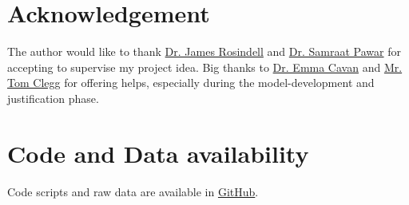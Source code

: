 \documentclass[../thesis.tex]{subfiles} %
\begin{document}
\section{Acknowledgement}
The author would like to thank \href{mailto:j.rosindell@imperial.ac.uk}{Dr. James Rosindell} and \href{mailto:s.pawar@imperial.ac.uk}{Dr. Samraat Pawar} for accepting to supervise my project idea.  
Big thanks to \href{mailto:e.cavan@imperial.ac.uk}{Dr. Emma Cavan} and \href{mailto:t.clegg17@imperial.ac.uk}{Mr. Tom Clegg} for offering helps, especially during the model-development and justification phase.


\section{Code and Data availability}
Code scripts and raw data are available in \href{https://github.com/ph-u/Project}{GitHub}.
\end{document}

